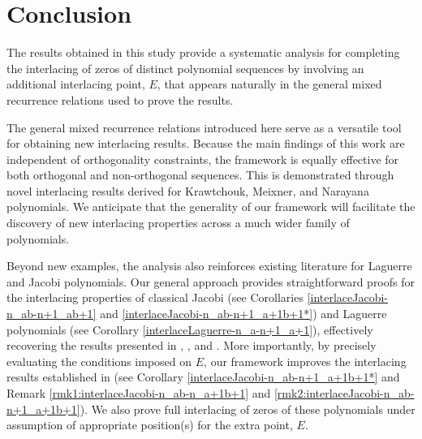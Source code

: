 \documentclass[final,3p,times,12pt]{elsarticle}
\numberwithin{equation}{section}  %
\begin{document}
\section{Conclusion}
The results obtained in this study provide a systematic analysis for completing the interlacing of zeros of distinct polynomial sequences by involving an additional interlacing point, $E$, that appears naturally in the general mixed recurrence relations used to prove the results.
 
The general mixed recurrence relations introduced here serve as a versatile tool for obtaining new interlacing results. Because the main findings of this work are independent of orthogonality constraints, the framework is equally effective for both orthogonal and non-orthogonal sequences. This is demonstrated through novel interlacing results derived for Krawtchouk, Meixner, and Narayana polynomials. We anticipate that the generality of our framework will facilitate the discovery of new interlacing properties across a much wider family of polynomials.
 
Beyond new examples, the analysis also reinforces existing literature for Laguerre and Jacobi polynomials. Our general approach provides straightforward proofs for the interlacing properties of classical Jacobi (see Corollaries \ref{interlaceJacobi-n_ab-n+1_ab+1} and \ref{interlaceJacobi-n_ab-n+1_a+1b+1*}) and Laguerre polynomials (see Corollary \ref{interlaceLaguerre-n_a-n+1_a+1}), effectively recovering the results presented in \cite[Theorem 1]{Arvesu-Driver-Littlejohn-RamanujanJ-2023}, \cite[Theorem 3]{Arvesu-Driver-Littlejohn-RamanujanJ-2023}, and \cite[Theorem 2.1]{Arvesu-Driver-Littlejohn-ITSF-2021}. More importantly, by precisely evaluating the conditions imposed on $E$, our framework improves the interlacing results established in \cite[Theorem 3]{Arvesu-Driver-Littlejohn-RamanujanJ-2023} (see Corollary \ref{interlaceJacobi-n_ab-n+1_a+1b+1*} and Remark   \ref{rmk1:interlaceJacobi-n_ab-n_a+1b+1} and \ref{rmk2:interlaceJacobi-n_ab-n+1_a+1b+1}). We also prove full interlacing of zeros of these polynomials under assumption of appropriate position(s) for the extra point, $E$.





%





\end{document}
